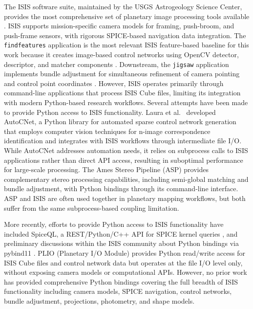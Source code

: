 \documentclass[lettersize,journal]{IEEEtran}
\begin{document}
The ISIS software suite, maintained by the USGS Astrogeology Science Center, provides the most comprehensive set of planetary image processing tools available \cite{usgs2024isis}. ISIS supports mission-specific camera models for framing, push-broom, and push-frame sensors, with rigorous SPICE-based navigation data integration. The \texttt{findfeatures} application is the most relevant ISIS feature-based baseline for this work because it creates image-based control networks using OpenCV detector, descriptor, and matcher components \cite{usgs2024findfeatures}. Downstream, the \texttt{jigsaw} application implements bundle adjustment for simultaneous refinement of camera pointing and control point coordinates \cite{edmundson2012jigsaw}. However, ISIS operates primarily through command-line applications that process ISIS Cube files, limiting its integration with modern Python-based research workflows. Several attempts have been made to provide Python access to ISIS functionality. Laura et al.\ \cite{laura2018autocnet} developed AutoCNet, a Python library for automated sparse control network generation that employs computer vision techniques for n-image correspondence identification and integrates with ISIS workflows through intermediate file I/O. While AutoCNet addresses automation needs, it relies on subprocess calls to ISIS applications rather than direct API access, resulting in suboptimal performance for large-scale processing. The Ames Stereo Pipeline (ASP) \cite{mcmichael2024asp} provides complementary stereo processing capabilities, including semi-global matching and bundle adjustment, with Python bindings through its command-line interface. ASP and ISIS are often used together in planetary mapping workflows, but both suffer from the same subprocess-based coupling limitation.

More recently, efforts to provide Python access to ISIS functionality have included SpiceQL, a REST/Python/C++ API for SPICE kernel queries \cite{usgs2024spiceql}, and preliminary discussions within the ISIS community about Python bindings via pybind11 \cite{pyisis2026discussion}. PLIO (Planetary I/O Module) provides Python read/write access for ISIS Cube files and control network data but operates at the file I/O level only, without exposing camera models or computational APIs. However, no prior work has provided comprehensive Python bindings covering the full breadth of ISIS functionality including camera models, SPICE navigation, control networks, bundle adjustment, projections, photometry, and shape models.
\end{document}
